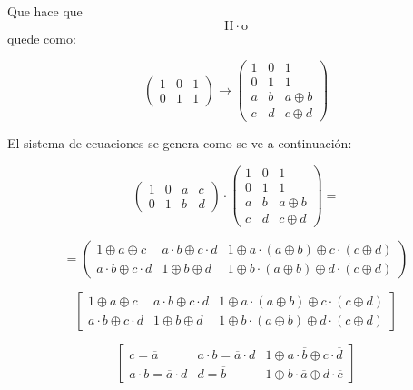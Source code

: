 \documentclass[
]{article}
\begin{document}
\begin{enumerate}
\begin{enumerate}
\begin{enumerate}
\begin{enumerate}
        Que hace
        que\[\mathtt{\mathrm{H}} \cdot \mathtt{\mathrm{o}}\]quede como:

        \[\begin{pmatrix}
        1 & 0 & 1 \\
        0 & 1 & 1
        \end{pmatrix}\rightarrow\begin{pmatrix}
        1 & 0 & 1 \\
        0 & 1 & 1 \\
        a & b & {a \oplus b} \\
        c & d & {c \oplus d}
        \end{pmatrix}\]

        El sistema de ecuaciones se genera como se ve a continuación:

        \[{\begin{pmatrix}
        1 & 0 & a & c \\
        0 & 1 & b & d
        \end{pmatrix} \cdot \begin{pmatrix}
        1 & 0 & 1 \\
        0 & 1 & 1 \\
        a & b & {a \oplus b} \\
        c & d & {c \oplus d}
        \end{pmatrix}} =\]

        \[= \begin{pmatrix}
        {1 \oplus a \oplus c} & {{a \cdot b} \oplus {c \cdot d}} & {1 \oplus {a \cdot {({a \oplus b})}} \oplus {c \cdot {({c \oplus d})}}} \\
        {{a \cdot b} \oplus {c \cdot d}} & {1 \oplus b \oplus d} & {1 \oplus {b \cdot {({a \oplus b})}} \oplus {d \cdot {({c \oplus d})}}}
        \end{pmatrix}\]

        \[\begin{bmatrix}
        {1 \oplus a \oplus c} & {{a \cdot b} \oplus {c \cdot d}} & {1 \oplus {a \cdot {({a \oplus b})}} \oplus {c \cdot {({c \oplus d})}}} \\
        {{a \cdot b} \oplus {c \cdot d}} & {1 \oplus b \oplus d} & {1 \oplus {b \cdot {({a \oplus b})}} \oplus {d \cdot {({c \oplus d})}}}
        \end{bmatrix}\]

        \[\begin{bmatrix}
        {c = \overline{a}} & {{a \cdot b} = {\overline{a} \cdot d}} & {1 \oplus {a \cdot \overline{b}} \oplus {c \cdot \overline{d}}} \\
        {{a \cdot b} = {\overline{a} \cdot d}} & {d = \overline{b}} & {1 \oplus {b \cdot \overline{a}} \oplus {d \cdot \overline{c}}}
        \end{bmatrix}\]


\end{enumerate}
\end{enumerate}
\end{enumerate}
\end{enumerate}
\end{document}
